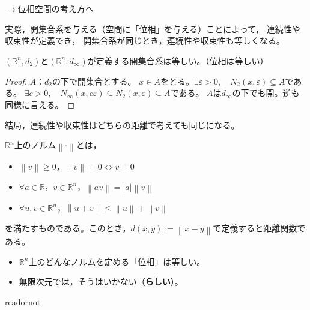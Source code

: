 \documentclass[uplatex]{jsarticle}
\begin{document}
$\longrightarrow$位相空間の考え方へ

実際，開集合系を与える（空間に「位相」を与える）ことによって，
連続性や収束性が定義でき，
開集合系が同じとき，連続性や収束性も等しくなる。

\begin{rei}
    $(\mathbb{R}^{n},d_{2})$と$(\mathbb{R}^{n},d_{\infty})$が定義する開集合系は等しい。（位相は等しい）
    \begin{proof}
        $A$：$d_{2}$の下で開集合とする。
        $x \in A$をとる。$\exists \varepsilon > 0, \quad N_{2}(x,\varepsilon) \subseteq A$である。
        $\exists c > 0, \quad N_{\infty} (x, c \varepsilon) \subseteq N_{2} (x, \varepsilon) \subseteq A$である。
        $A$は$d_{\infty}$の下でも開。逆も同様に言える。 
    \end{proof}
    結局，連続性や収束性はどちらの距離で考えても同じになる。
\end{rei}

\begin{rei}
    $\mathbb{R}^{n}$上のノルム$\left\| \cdot \right\|$とは，
    \begin{itemize}
        \vspace{-0.5\baselineskip}
        \item $\left\| v \right\| \ge 0$，\qquad $\left\| v \right\| = 0 \Longleftrightarrow v = 0$
        \item $\forall a \in \mathbb{R}$，$v \in \mathbb{R}^{n}$，$\left\| av \right\| = \left| a \right| \left\| v \right\|$
        \item $\forall u,v \in \mathbb{R}^{n}$，$\left\| u + v \right\| \le \left\| u \right\| + \left\| v \right\|$
        \vspace{-0.5\baselineskip}
    \end{itemize}
    を満たすものである。このとき，$d(x,y) := \left\| x - y \right\|$で定義すると距離関数である。
\end{rei}

\begin{itemize}
    \vspace{-0.5\baselineskip}
    \item $\mathbb{R}^{n}$上のどんなノルムを定める「位相」は等しい。
    \item 無限次元では，そうはいかない（{\bf らしい}）。
\end{itemize}

\expandafter\ifx\csname readornot\endcsname\relax
  
\end{document}

